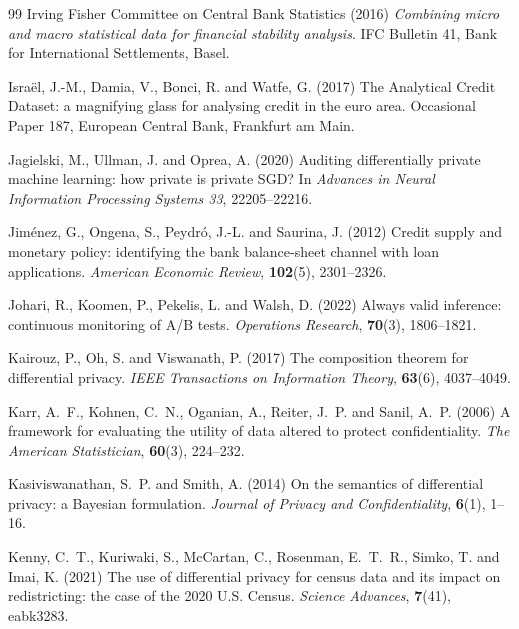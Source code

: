 \documentclass[11pt,a4paper]{article}
\theoremstyle{plain}
\theoremstyle{definition}
\begin{document}
\begin{thebibliography}{99}
Irving Fisher Committee on Central Bank Statistics (2016) \emph{Combining micro
and macro statistical data for financial stability analysis}. IFC Bulletin 41,
Bank for International Settlements, Basel.

Isra\"el, J.-M., Damia, V., Bonci, R. and Watfe, G. (2017) The Analytical Credit
Dataset: a magnifying glass for analysing credit in the euro area. Occasional
Paper 187, European Central Bank, Frankfurt am Main.

Jagielski, M., Ullman, J. and Oprea, A. (2020) Auditing differentially private
machine learning: how private is private SGD? In \emph{Advances in Neural
Information Processing Systems 33}, 22205--22216.

Jim\'enez, G., Ongena, S., Peydr\'o, J.-L. and Saurina, J. (2012) Credit supply
and monetary policy: identifying the bank balance-sheet channel with loan
applications. \emph{American Economic Review}, \textbf{102}(5), 2301--2326.

Johari, R., Koomen, P., Pekelis, L. and Walsh, D. (2022) Always valid inference:
continuous monitoring of A/B tests. \emph{Operations Research}, \textbf{70}(3),
1806--1821.

Kairouz, P., Oh, S. and Viswanath, P. (2017) The composition theorem for
differential privacy. \emph{IEEE Transactions on Information Theory},
\textbf{63}(6), 4037--4049.

Karr, A.~F., Kohnen, C.~N., Oganian, A., Reiter, J.~P. and Sanil, A.~P. (2006)
A framework for evaluating the utility of data altered to protect
confidentiality. \emph{The American Statistician}, \textbf{60}(3), 224--232.

Kasiviswanathan, S.~P. and Smith, A. (2014) On the semantics of differential
privacy: a Bayesian formulation. \emph{Journal of Privacy and
Confidentiality}, \textbf{6}(1), 1--16.

Kenny, C.~T., Kuriwaki, S., McCartan, C., Rosenman, E.~T.~R., Simko, T. and
Imai, K. (2021) The use of differential privacy for census data and its impact
on redistricting: the case of the 2020 U.S. Census. \emph{Science Advances},
\textbf{7}(41), eabk3283.


\end{thebibliography}
\end{document}
